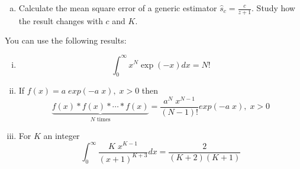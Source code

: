 \begin{prob}
\begin{enumerate}[a)]
    \item Calculate the mean square error of a generic estimator $\hat{s}_c = \frac{c}{z+1}$. Study how the result changes with $c$ and $K$.
    
    
\end{enumerate}

You can use the following results:
\begin{enumerate}[i.]
    \item $$\int_{0}^{\infty} x^N \exp(-x) dx = N!$$
    \item If $f(x) = a\;exp(-a\;x), \;x>0$ then 
    $$\underbrace{f(x)\ast f(x) \ast \cdots \ast f(x)}_\text{$N$ times} = \displaystyle\frac{a^N \; x^{N-1}}{(N-1)!} exp(-a\;x), \; x>0$$
    \item For $K$ an integer
    $$\int_0^\infty \frac{K\;x^{K-1}}{(x+1)^{K+3}} dx = \displaystyle\frac{2}{(K+2)(K+1)}  $$
\end{enumerate} 

\end{prob}


